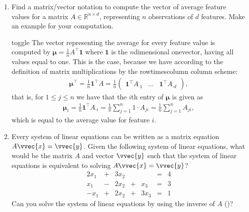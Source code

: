 \documentclass[letterpaper,10pt,english]{jupyterBook}
\begin{document}
\begin{enumerate}
\begin{sphinxuseclass}{toggle}
\sphinxAtStartPar
The table of \(AA^\top\) denotes in entry \(jl\) the number of symptoms patient \(j\) and patient \(l\) have in common. The table of \(A^\top A\) denotes in entry \(ik\) the number of patients which exibit symptoms \(i\) and \(k\).

\end{sphinxuseclass}
\item {} 
\sphinxAtStartPar
Find a matrix/vector notation to compute the vector of average feature values for a matrix \(A\in\mathbb{R}^{n\times d}\), representing \(n\) observations of \(d\) features. Make an example for your computation.

\begin{sphinxuseclass}{toggle}
\sphinxAtStartPar
The vector representing the average for every feature value is computed by \(\bm{\mu} = \frac{1}{n} A^\top \mathbf{1}\) where \(\mathbf{1}\) is the \(n\)\sphinxhyphen{}dimensional one\sphinxhyphen{}vector, having all values equal to one. This is the case, because we have according to the definition of matrix multiplications by the row\sphinxhyphen{}times\sphinxhyphen{}column column scheme:
\begin{align*}
     \bm{\mu}^\top = \frac{1}{n}\mathbf{1}^\top A = \frac1n \begin{pmatrix}\mathbf{1}^\top A_{\cdot 1} &\ldots & \mathbf{1}^\top A_{\cdot d}\end{pmatrix},
 \end{align*}
\sphinxAtStartPar
that is, for \(1\leq j \leq n\) we have that the \(i\)\sphinxhyphen{}th entry of \(\bm \mu\) is given as
\begin{align*}
     \bm\mu_{i} = \frac1n \mathbf{1}^\top A_{\cdot i} = \frac1n \sum_{j=1}^n 1\cdot A_{ji}= \frac1n \sum_{j=1}^n A_{ji},
 \end{align*}
\sphinxAtStartPar
which is equal to the average value for feature \(i\).

\end{sphinxuseclass}
\item {} 
\sphinxAtStartPar
Every system of linear equations can be written as a matrix equation \(A\vvec{x}=\vvec{y}\). Given the following system of linear equations, what would be the matrix \(A\) and vector \(\vvec{y}\) such that the system of linear equations is equivalent to solving \(A\vvec{x}=\vvec{y}\)?
\label{equation:linalg_exercises:d12361c7-7d1f-4f84-89a0-3355350e1c5c}\begin{align}
        2x_1 &+& 3x_2 && &=&4\\
        x_1  &-& 2x_2 &+& x_3 &=& 3\\
        -x_1 &+& 2x_2 &+& 3x_3 &=& 1
    \end{align}
\sphinxAtStartPar
Can you solve the system of linear equations by using the inverse of \(A\) ()?


\end{enumerate}
\end{document}
